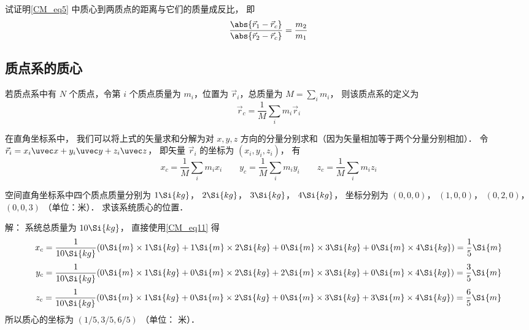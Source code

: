 \begin{exer}{}
试证明\autoref{CM_eq5} 中质心到两质点的距离与它们的质量成反比， 即
\begin{equation}\label{CM_eq6}
\frac{\abs{\vec r_1 - \vec r_c}}{\abs{\vec r_2 - \vec r_c}} = \frac{m_2}{m_1}
\end{equation}
\end{exer}

\subsection{质点系的质心}
若质点系中有 $N$ 个质点，令第 $i$ 个质点质量为 $m_i$，位置为 $\vec r_i$，总质量为 $M = \sum\limits_i m_i$， 则该质点系的定义为
\begin{equation}\label{CM_eq1}
\vec r_c = \frac{1}{M}\sum_i m_i \vec r_i
\end{equation}

在直角坐标系中， 我们可以将上式的矢量求和分解为对 $x, y, z$ 方向的分量分别求和（因为矢量相加等于两个分量分别相加）． 令 $\vec r_i = x_i \uvec x + y_i \uvec y + z_i \uvec z$， 即矢量 $\vec r_i$ 的坐标为 $(x_i, y_i, z_i)$， 有
\begin{equation}\label{CM_eq11}
x_c = \frac{1}{M}\sum_i m_i x_i \qquad
y_c = \frac{1}{M}\sum_i m_i y_i \qquad
z_c = \frac{1}{M}\sum_i m_i z_i
\end{equation}

\begin{exam}{}
空间直角坐标系中四个质点质量分别为 $1 \Si{kg}$， $2 \Si{kg}$， $3 \Si{kg}$， $4 \Si{kg}$， 坐标分别为 $(0, 0, 0)$， $(1, 0, 0)$， $(0, 2, 0)$， $(0, 0, 3)$ （单位：米）． 求该系统质心的位置．

解： 系统总质量为 $10 \Si{kg}$， 直接使用\autoref{CM_eq11} 得
\begin{equation}
x_c = \frac{1}{10 \Si{kg}} (0 \Si{m} \times 1 \Si{kg} + 1 \Si{m}\times 2 \Si{kg} + 0\Si{m} \times 3 \Si{kg} + 0 \Si{m}\times 4 \Si{kg}) = \frac15 \Si{m}
\end{equation}
\begin{equation}
y_c = \frac{1}{10 \Si{kg}} (0\Si{m}\times 1 \Si{kg} + 0\Si{m} \times 2 \Si{kg} + 2\Si{m} \times 3 \Si{kg} + 0 \Si{m}\times 4 \Si{kg}) = \frac35 \Si{m}
\end{equation}
\begin{equation}
z_c = \frac{1}{10 \Si{kg}} (0\Si{m}\times 1 \Si{kg} + 0\Si{m} \times 2 \Si{kg} + 0\Si{m} \times 3 \Si{kg} + 3 \Si{m}\times 4 \Si{kg}) = \frac65 \Si{m}
\end{equation}
所以质心的坐标为 $(1/5, 3/5, 6/5)$ （单位： 米）．
\end{exam}

